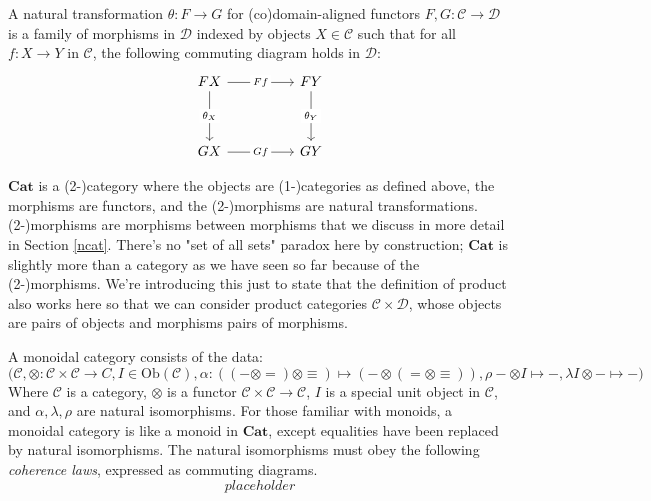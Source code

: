 \begin{defn}
A natural transformation $\theta: F \rightarrow G$ for (co)domain-aligned functors $F,G: \mathcal{C} \rightarrow \mathcal{D}$ is a family of morphisms in $\mathcal{D}$ indexed by objects $X \in \mathcal{C}$ such that for all $f: X \rightarrow Y$ in $\mathcal{C}$, the following commuting diagram holds in $\mathcal{D}$:
\[\begin{tikzcd}
	FX && FY \\
	\\
	GX && GY
	\arrow["{\theta_X}"{description}, from=1-1, to=3-1]
	\arrow["Ff"{description}, from=1-1, to=1-3]
	\arrow["{\theta_Y}"{description}, from=1-3, to=3-3]
	\arrow["Gf"{description}, from=3-1, to=3-3]
\end{tikzcd}\]
\end{defn}

\begin{defn}
$\mathbf{Cat}$ is a (2-)category where the objects are (1-)categories as defined above, the morphisms are functors, and the (2-)morphisms are natural transformations. (2-)morphisms are morphisms between morphisms that we discuss in more detail in Section \ref{ncat}. There's no "set of all sets" paradox here by construction; $\mathbf{Cat}$ is slightly more than a category as we have seen so far because of the (2-)morphisms. We're introducing this just to state that the definition of product also works here so that we can consider product categories $\mathcal{C} \times \mathcal{D}$, whose objects are pairs of objects and morphisms pairs of morphisms.
\end{defn}

\begin{defn}
A monoidal category consists of the data:
\[\big(\mathcal{C},\otimes: \mathcal{C} \times \mathcal{C} \rightarrow C, I \in \text{Ob}(\mathcal{C}), \alpha: ((- \otimes =) \otimes \equiv) \mapsto (- \otimes (= \otimes \equiv)), \rho - \otimes I \mapsto -, \lambda I \otimes - \mapsto -\big)\]
Where $\mathcal{C}$ is a category, $\otimes$ is a functor $\mathcal{C} \times \mathcal{C} \rightarrow \mathcal{C}$, $I$ is a special unit object in $\mathcal{C}$, and $\alpha,\lambda,\rho$ are natural isomorphisms. For those familiar with monoids, a monoidal category is like a monoid in $\mathbf{Cat}$, except equalities have been replaced by natural isomorphisms. The natural isomorphisms must obey the following \emph{coherence laws}, expressed as commuting diagrams.
\[placeholder\]
\end{defn}

